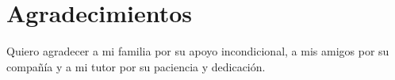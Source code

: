 \chapter*{Agradecimientos}
\label{ack}
 Quiero agradecer a mi familia por su apoyo incondicional, a mis amigos por su compañía y a mi tutor por su paciencia y dedicación.

